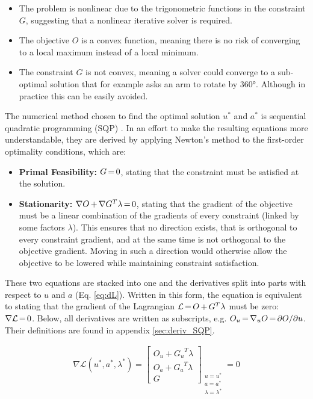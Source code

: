 \documentclass[conference]{IEEEtran}
\newcommand{\m}[1]{\begin{bmatrix}#1\end{bmatrix}}
\newcommand{\mcomp}{\thinmuskip=3mu\medmuskip=3mu\thickmuskip=3mu}
\begin{document}
\par
\begin{itemize}
	\item The problem is nonlinear due to the trigonometric functions in the constraint $G$, suggesting that a nonlinear iterative solver is required.
	\item The objective $O$ is a convex function, meaning there is no risk of converging to a local maximum instead of a local minimum.
	\item The constraint $G$ is not convex, meaning a solver could converge to a sub-optimal solution that for example asks an arm to rotate by 360°. Although in practice this can be easily avoided.
\end{itemize}
\par
The numerical method chosen to find the optimal solution $u^*$ and $a^*$ is sequential quadratic programming (SQP) \cite{1999_wright_numop}. In an effort to make the resulting equations more understandable, they are  derived by applying Newton's method to the first-order optimality conditions, which are:
\par
\begin{itemize}
	\item \textbf{Primal Feasibility:} $\mcomp G = 0$, stating that the constraint must be satisfied at the solution.
	\item \textbf{Stationarity:} $\mcomp \nabla O + \nabla G^T \lambda = 0$, stating that the gradient of the objective must be a linear combination of the gradients of every constraint (linked by some factors $\lambda$). This ensures that no direction exists, that is orthogonal to every constraint gradient, and at the same time is not orthogonal to the objective gradient. Moving in such a direction would otherwise allow the objective to be lowered while maintaining constraint satisfaction.
\end{itemize}
\par
These two equations are stacked into one and the derivatives split into parts with respect to $u$ and $a$ (Eq. \ref{eq:dL}). Written in this form, the equation is equivalent to stating that the gradient of the Lagrangian $\mcomp\mathcal{L}=O+G^T\lambda$ must be zero: $\mcomp\nabla\mathcal{L}=0$. Below, all derivatives are written as subscripts, e.g. $\mcomp O_u = \nabla_u O = \partial O/\partial u$. Their definitions are found in appendix \ref{sec:deriv_SQP}.
\par
\begin{align}
	\nabla\mathcal{L}(u^*,a^*,\lambda^*) = \m{O_u + {G_u}^T \lambda \\ O_a + {G_a}^T \lambda \\ G} _{\substack{u=u^*\\a=a^*\\\lambda=\lambda^*}}= 0
	\label{eq:dL}
\end{align}
\end{document}
